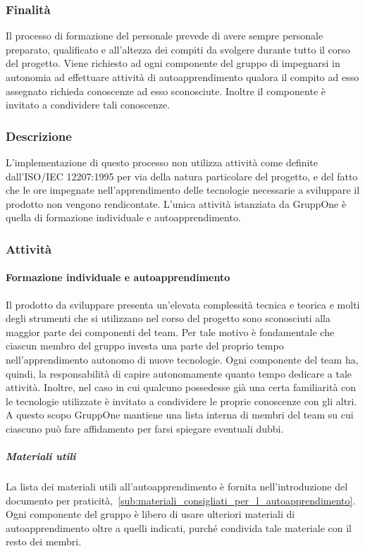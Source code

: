 \documentclass[../../norme-di-progetto.tex]{subfiles}
\begin{document}
\subsubsection{Finalità}%
\label{subs:formazione_del_personale/finalita}

Il processo di formazione del personale prevede di avere sempre personale preparato, qualificato e all'altezza dei compiti da svolgere durante tutto il corso del progetto.
Viene richiesto ad ogni componente del gruppo di impegnarsi in autonomia ad effettuare attività di autoapprendimento qualora il compito
ad esso assegnato richieda conoscenze ad esso sconosciute. Inoltre il componente è invitato a condividere tali conoscenze.

\subsubsection{Descrizione}%
\label{subs:formazione_del_personale/descrizione}

L'implementazione di questo processo non utilizza attività come definite dall'ISO/IEC 12207:1995 per via della natura particolare del progetto, e del fatto che le ore impegnate nell'apprendimento delle tecnologie necessarie a sviluppare il prodotto non vengono rendicontate.
L'unica attività istanziata da GruppOne è quella di formazione individuale e autoapprendimento.

\subsubsection{Attività}%
\label{subs:formazione_del_personale/attivita}

\paragraph{Formazione individuale e autoapprendimento}%
\label{par:formazione_individuale_e_autoapprendimento}

Il prodotto da sviluppare presenta un'elevata complessità tecnica e teorica e molti degli strumenti che si utilizzano nel corso del progetto sono sconosciuti alla maggior parte dei componenti del team.
Per tale motivo è fondamentale che ciascun membro del gruppo investa una parte del proprio tempo nell'apprendimento autonomo di nuove tecnologie.
Ogni componente del team ha, quindi, la responsabilità di capire autonomamente quanto tempo dedicare a tale attività.
Inoltre, nel caso in cui qualcuno possedesse già una certa familiarità con le tecnologie utilizzate è invitato a condividere le proprie conoscenze con gli altri. A questo scopo GruppOne mantiene una lista interna di membri del team su cui ciascuno può fare affidamento per farsi spiegare eventuali dubbi.

\subparagraph{Materiali utili}%
\label{subp:materiali_utili}

La lista dei materiali utili all'autoapprendimento è fornita nell'introduzione del documento per praticità,~\ref{sub:materiali_consigliati_per_l_autoapprendimento}.
Ogni componente del gruppo è libero di usare ulteriori materiali di autoapprendimento oltre a quelli indicati, purché condivida tale materiale con il resto dei membri.
\end{document}

